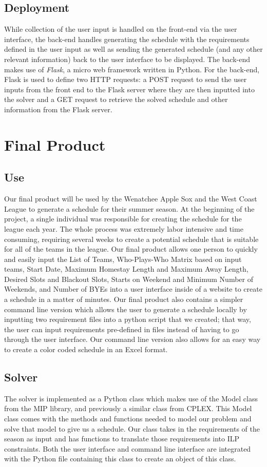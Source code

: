 \documentclass[book]{hmcclinic}
\begin{document}
 \section{Deployment}
While collection of the user input is handled on the front-end via the user interface, the back-end handles generating the schedule with the requirements defined in the user input as well as sending the generated schedule (and any other relevant information) back to the user interface to be displayed. The back-end makes use of \textit{Flask}, a micro web framework written in Python. For the back-end, Flask is used to define two HTTP requests: a POST request to send the user inputs from the front end to the Flask server where they are then inputted into the solver and a GET request to retrieve the solved schedule and other information from the Flask server. 

 \chapter{Final Product}

\section{Use}
Our final product will be used by the Wenatchee Apple Sox and the West Coast League to generate a schedule for their summer season. At the beginning of the project, a single individual was responsible for creating the schedule for the league each year. The whole process was extremely labor intensive and time consuming, requiring several weeks to create a potential schedule that is suitable for all of the teams in the league. Our final product allows one person to quickly and easily input the List of Teams, Who-Plays-Who Matrix based on input teams, Start Date, Maximum Homestay Length and Maximum Away Length, Desired Slots and Blackout Slots, Starts on Weekend and Minimum Number of Weekends, and Number of BYEs into a user interface inside of a website to create a schedule in a matter of minutes. Our final product also contains a simpler command line version which allows the user to generate a schedule locally by inputting two requirement files into a python script that we created; that way, the user can input requirements pre-defined in files instead of having to go through the user interface. Our command line version also allows for an easy way to create a color coded schedule in an Excel format.  

\section{Solver}
The solver is implemented as a Python class which makes use of the Model class from the MIP library, and previously a similar class from CPLEX. This Model class comes with the methods and functions needed to model our problem and solve that model to give us a schedule. Our class takes in the requirements of the season as input and has functions to translate those requirements into ILP constraints. Both the user interface and command line interface are integrated with the Python file containing this class to create an object of this class.
\end{document}
